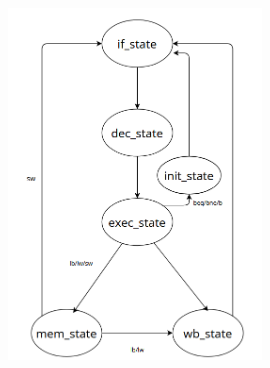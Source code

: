 
\begin{figure}[h]
    \centering
    \includegraphics[width=0.6\textwidth]{IMAGES/state_di.png} %
\end{figure}
